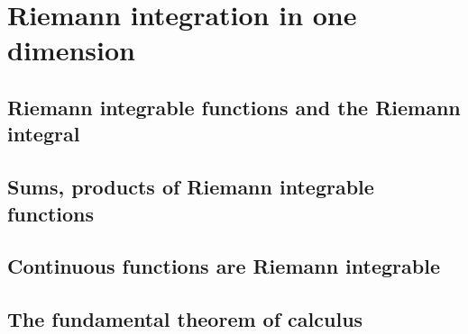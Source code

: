 \section{Riemann integration in one dimension}

\subsection{Riemann integrable functions and the Riemann integral}

\subsection{Sums, products of Riemann integrable functions}

\subsection{Continuous functions are Riemann integrable}

\subsection{The fundamental theorem of calculus}
